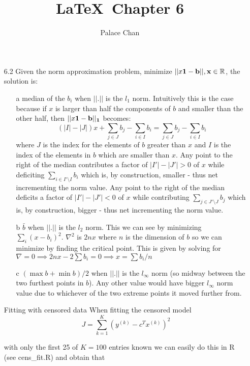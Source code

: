 \documentclass[12pt]{article}
\title{\LaTeX\ Chapter 6}
\author{Palace Chan}
\begin{document}
\maketitle
\newpage

\begin{itemize}

\item[6.2] Given the norm approximation problem, minimize $||x \bf{1} - b||, x \in \mathbb{R}$, the solution is:
  \begin{enumerate}
  \item[a] median of the $b_i$ when $||.||$ is the $l_1$ norm. Intuitively this is the case because if $x$ is larger than half the components of $b$ and smaller than the other half, then $||x \bf{1} - b||_1$ becomes:
    $$(|I| - |J|) x + \sum_{j \in J} b_j - \sum_{i \in I} b_i = \sum_{j \in J} b_j - \sum_{i \in I} b_i$$
    where $J$ is the index for the elements of $b$ greater than $x$ and $I$ is the index of the elements in $b$ which are smaller than $x$.
    Any point to the right of the median contributes a factor of $|I'| - |J'| > 0$ of $x$ while deficiting $\sum_{i \in I' \setminus I} b_i$ which is, by construction, smaller - thus net incrementing the norm value.
    Any point to the right of the median deficits a factor of $|I'| - |J'| < 0$ of $x$ while contributing $\sum_{j \in J' \setminus J} b_j$ which is, by construction, bigger - thus net incrementing the norm value.
    
  \item[b] $\bar{b}$ when $||.||$ is the $l_2$ norm. This we can see by minimizing $\sum_i (x - b_i)^2$. $\nabla^2$ is $2nx$ where $n$ is the dimension of $b$ so we can minimize by finding the critical point.
    This is given by solving for $\nabla = 0 \implies 2nx - 2 \sum b_i = 0 \implies x = \sum b_i / n$
    
  \item[c] $(\max{b} + \min{b})/2$ when $||.||$ is the $l_\infty$ norm (so midway between the two furthest points in $b$). Any other value would have bigger $l_\infty$ norm value due to whichever of the two extreme points it moved further from.
  \end{enumerate}

\item[Fitting with censored data]
  When fitting the censored model
  $$J = \sum_{k=1}^K \left( y^{(k)} - c^T x^{(k)} \right)^2$$

  with only the first 25 of $K = 100$ entries known we can easily do this in R (see cens_fit.R) and obtain that


\end{itemize}
\end{document}
